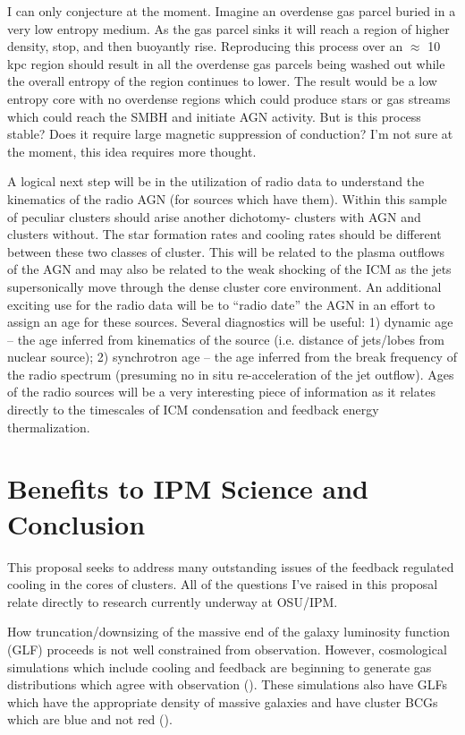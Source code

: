 \documentclass[11pt]{article}
\begin{document}
I can only conjecture at the moment. Imagine an overdense gas parcel
buried in a very low entropy medium. As the gas parcel sinks it will
reach a region of higher density, stop, and then buoyantly
rise. Reproducing this process over an $\approx$ 10 kpc region should
result in all the overdense gas parcels being washed out while the
overall entropy of the region continues to lower. The result would be
a low entropy core with no overdense regions which could produce stars
or gas streams which could reach the SMBH and initiate AGN
activity. But is this process stable? Does it require large magnetic
suppression of conduction? I'm not sure at the moment, this
idea requires more thought.

A logical next step will be in the utilization of radio data to
understand the kinematics of the radio AGN (for sources which have
them). Within this sample of peculiar clusters should arise another
dichotomy- clusters with AGN and clusters without. The star formation
rates and cooling rates should be different between these two classes
of cluster. This will be related to the plasma outflows of the AGN and
may also be related to the weak shocking of the ICM as the jets
supersonically move through the dense cluster core environment. An
additional exciting use for the radio data will be to ``radio date''
the AGN in an effort to assign an age for these sources. Several
diagnostics will be useful: 1) dynamic age -- the age inferred from
kinematics of the source (i.e. distance of jets/lobes from nuclear
source); 2) synchrotron age -- the age inferred from the break frequency
of the radio spectrum (presuming no in situ re-acceleration of the jet
outflow). Ages of the radio sources will be a very interesting piece
of information as it relates directly to the timescales of ICM
condensation and feedback energy thermalization.

\section{Benefits to IPM Science and Conclusion}
This proposal seeks to address many outstanding issues of the feedback
regulated cooling in the cores of clusters. All of the questions I've
raised in this proposal relate directly to research currently underway
at OSU/IPM.

How truncation/downsizing of the massive end of the galaxy luminosity
function (GLF) proceeds is not well constrained from
observation. However, cosmological simulations which include cooling
and feedback are beginning to generate gas distributions which agree
with observation (\cite{2007ApJ...668....1N}). These simulations also
have GLFs which have the appropriate density of massive galaxies and
have cluster BCGs which are blue and not red
(\cite{2006MNRAS.365...11C}).
\end{document}
